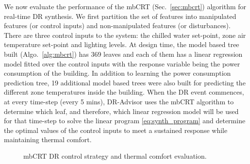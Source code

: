 We now evaluate the performance of the mbCRT (Sec.~\ref{sec:mbcrt}) algorithm for real-time DR synthesis. 
We first partition the set of features into manipulated features (or control inputs) and non-manipulated features (or disturbances). 
There are three control inputs to the system: the chilled water set-point, zone air temperature set-point and lighting levels.
At design time, the model based tree built (Algo.~\ref{alg:mbcrt}) has 369 leaves and each of them has a linear regression model fitted over the control inputs with  the response variable being the power consumption of the building.
In addition to learning the power consumption prediction tree, 19 additional model based trees were also built for predicting the different zone temperatures inside the building.
When the DR event commences, at every time-step (every 5 mins), DR-Advisor uses the mbCRT algorithm to determine which leaf, and therefore, which linear regression model will be used for that time-step to solve the linear program \eqref{eq:synth_program} and determine the optimal values of the control inputs to meet a sustained response while maintaining thermal comfort.
%

\begin{figure}[b]
\centering
{} \hspace{2pt}
\caption{mbCRT DR control strategy and thermal comfort evaluation.}
\end{figure}

